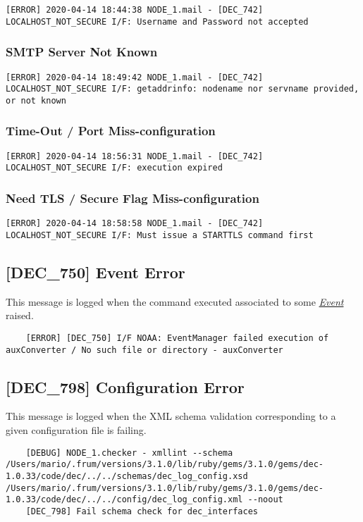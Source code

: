 \documentclass[dec_sum_main.tex]{subfiles}
\begin{document}
\begin{verbatim}
[ERROR] 2020-04-14 18:44:38 NODE_1.mail - [DEC_742] LOCALHOST_NOT_SECURE I/F: Username and Password not accepted
\end{verbatim}

\subsubsection{SMTP Server Not Known}

\begin{verbatim}
[ERROR] 2020-04-14 18:49:42 NODE_1.mail - [DEC_742] LOCALHOST_NOT_SECURE I/F: getaddrinfo: nodename nor servname provided, or not known
\end{verbatim}

\subsubsection{Time-Out / Port Miss-configuration}
\begin{verbatim}
[ERROR] 2020-04-14 18:56:31 NODE_1.mail - [DEC_742] LOCALHOST_NOT_SECURE I/F: execution expired
\end{verbatim}

\subsubsection{Need TLS / Secure Flag Miss-configuration}
\begin{verbatim}
[ERROR] 2020-04-14 18:58:58 NODE_1.mail - [DEC_742] LOCALHOST_NOT_SECURE I/F: Must issue a STARTTLS command first
\end{verbatim}

\label{DEC750}
\subsection{[DEC\_750] Event Error}
This message is logged when the command executed associated to some \hyperref[Events]{\textit{Event}} raised.
\begin{verbatim}
	[ERROR] [DEC_750] I/F NOAA: EventManager failed execution of auxConverter / No such file or directory - auxConverter
\end{verbatim}


\label{DEC798}
\subsection{[DEC\_798] Configuration Error}
This message is logged when the XML schema validation corresponding to a given configuration file is failing. 
\begin{verbatim}
	[DEBUG] NODE_1.checker - xmllint --schema /Users/mario/.frum/versions/3.1.0/lib/ruby/gems/3.1.0/gems/dec-1.0.33/code/dec/../../schemas/dec_log_config.xsd /Users/mario/.frum/versions/3.1.0/lib/ruby/gems/3.1.0/gems/dec-1.0.33/code/dec/../../config/dec_log_config.xml --noout
	[DEC_798] Fail schema check for dec_interfaces
\end{verbatim}
\end{document}
